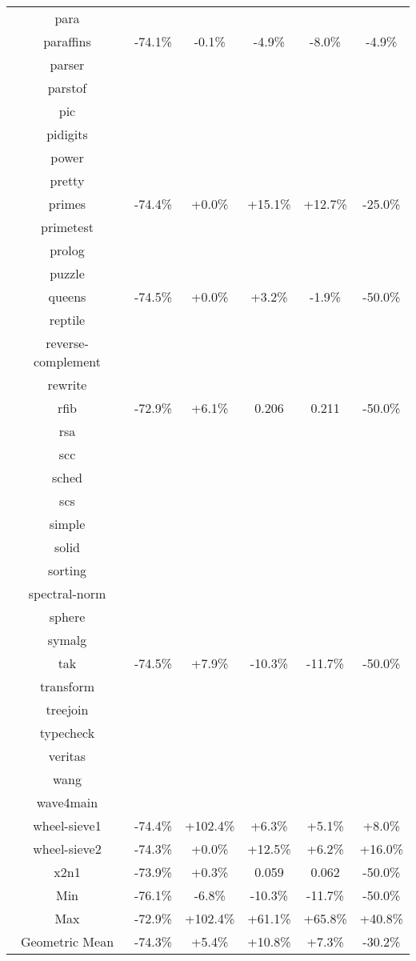 \begin{tabular}{ c c c c c c }
para &  &  &  &  & \\
paraffins & -74.1\% & -0.1\% & -4.9\% & -8.0\% & -4.9\%\\
parser &  &  &  &  & \\
parstof &  &  &  &  & \\
pic &  &  &  &  & \\
pidigits &  &  &  &  & \\
power &  &  &  &  & \\
pretty &  &  &  &  & \\
primes & -74.4\% & +0.0\% & +15.1\% & +12.7\% & -25.0\%\\
primetest &  &  &  &  & \\
prolog &  &  &  &  & \\
puzzle &  &  &  &  & \\
queens & -74.5\% & +0.0\% & +3.2\% & -1.9\% & -50.0\%\\
reptile &  &  &  &  & \\
reverse-complement &  &  &  &  & \\
rewrite &  &  &  &  & \\
rfib & -72.9\% & +6.1\% & 0.206 & 0.211 & -50.0\%\\
rsa &  &  &  &  & \\
scc &  &  &  &  & \\
sched &  &  &  &  & \\
scs &  &  &  &  & \\
simple &  &  &  &  & \\
solid &  &  &  &  & \\
sorting &  &  &  &  & \\
spectral-norm &  &  &  &  & \\
sphere &  &  &  &  & \\
symalg &  &  &  &  & \\
tak & -74.5\% & +7.9\% & -10.3\% & -11.7\% & -50.0\%\\
transform &  &  &  &  & \\
treejoin &  &  &  &  & \\
typecheck &  &  &  &  & \\
veritas &  &  &  &  & \\
wang &  &  &  &  & \\
wave4main &  &  &  &  & \\
wheel-sieve1 & -74.4\% & +102.4\% & +6.3\% & +5.1\% & +8.0\%\\
wheel-sieve2 & -74.3\% & +0.0\% & +12.5\% & +6.2\% & +16.0\%\\
x2n1 & -73.9\% & +0.3\% & 0.059 & 0.062 & -50.0\%\\
\hline
Min & -76.1\% & -6.8\% & -10.3\% & -11.7\% & -50.0\%\\
Max & -72.9\% & +102.4\% & +61.1\% & +65.8\% & +40.8\%\\
Geometric Mean & -74.3\% & +5.4\% & +10.8\% & +7.3\% & -30.2\%\\


\end{tabular}
\begin{verbatim}

\end{verbatim}
